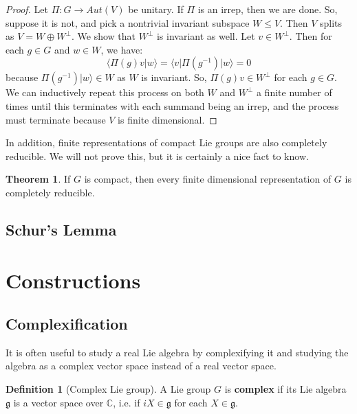 \documentclass[11pt, oneside]{article}   	%
\theoremstyle{definition}
\newtheorem{definition}{Definition}[section]
\newtheorem{theorem}{Theorem}[section]
\begin{document}
\begin{proof}
	Let $\Pi : G\rightarrow Aut(V)$ be unitary. If $\Pi$ is an irrep, then we are done. So, suppose it is not, and pick 
	a nontrivial invariant subspace $W\leq V$. Then $V$ splits as $V = W\oplus W^\perp$. We show that $W^\perp$ 
	is invariant as well. Let $v\in W^\perp$. Then for each $g\in G$ and $w\in W$, we have:
	\begin{equation}
		\langle \Pi(g)v|w\rangle = \langle v | \Pi(g^{-1}) |w\rangle = 0
	\end{equation}
	because $\Pi(g^{-1})|w\rangle\in W$ as $W$ is invariant. So, $\Pi(g)v\in W^\perp$ for each $g\in G$. We 
	can inductively repeat this process on both $W$ and $W^\perp$ a finite number of times until this terminates 
	with each summand being an irrep, and the process must terminate because $V$ is finite dimensional. 
\end{proof}

In addition, finite representations of compact Lie groups are also completely reducible. We will not prove this, but it 
is certainly a nice fact to know.

\begin{theorem}
	If $G$ is compact, then every finite dimensional representation of $G$ is completely reducible.
\end{theorem}

\subsection{Schur's Lemma}



\newpage
\section{Constructions}

\subsection{Complexification}

It is often useful to study a real Lie algebra by complexifying it and studying the algebra as a complex 
vector space instead of a real vector space. 
\begin{definition}[Complex Lie group]
	A Lie group $G$ is \textbf{complex} if its Lie algebra $\mathfrak g$ is a vector space over $\mathbb C$, 
	i.e. if $iX\in\mathfrak g$ for each $X\in\mathfrak g$. 
\end{definition}
\end{document}
